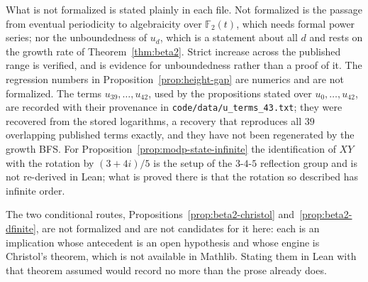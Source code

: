 \documentclass[11pt]{article}
\theoremstyle{plain}
\theoremstyle{definition}
\theoremstyle{remark}
\begin{document}
What is not formalized is stated plainly in each file. Not formalized is the passage
from eventual periodicity to algebraicity over $\mathbb{F}_2(t)$, which needs formal power
series; nor the unboundedness of $u_d$, which is a statement about all $d$ and rests on the
growth rate of Theorem~\ref{thm:beta2}. Strict increase across the published range is
verified, and
is evidence for unboundedness rather than a proof of it. The regression numbers in
Proposition~\ref{prop:height-gap} are numerics and are not formalized. The terms
$u_{39}, \ldots, u_{42}$, used by the propositions stated over $u_0, \ldots, u_{42}$, are
recorded with their provenance in \texttt{code/data/u\_terms\_43.txt}; they were recovered
from the stored logarithms, a recovery that reproduces all $39$ overlapping published terms
exactly, and they have not been regenerated by the growth BFS. For
Proposition~\ref{prop:modp-state-infinite} the identification of $XY$ with the rotation by
$(3+4i)/5$ is the setup of the $3$-$4$-$5$ reflection group and is not re-derived in Lean;
what is proved there is that the rotation so described has infinite order.

The two conditional routes, Propositions~\ref{prop:beta2-christol}
and~\ref{prop:beta2-dfinite}, are not formalized and are not candidates for it here: each is
an implication whose antecedent is an open hypothesis and whose engine is Christol's theorem,
which is not available in Mathlib. Stating them in Lean with that theorem assumed would record
no more than the prose already does.
\end{document}
